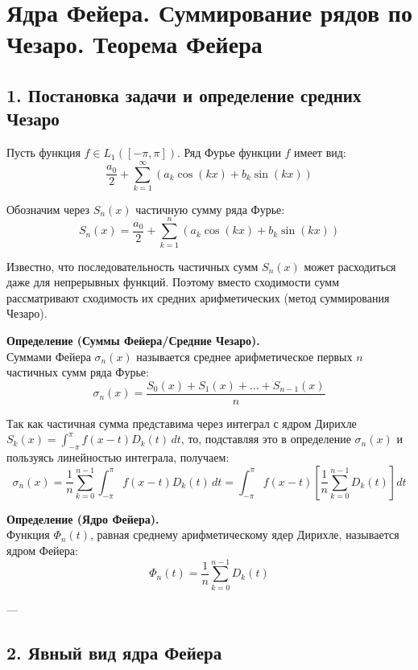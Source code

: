 \documentclass[12pt,a4paper,openany]{book}
\begin{document}
\section{ Ядра Фейера. Суммирование рядов по Чезаро. Теорема Фейера}

\subsection{1. Постановка задачи и определение средних Чезаро}

Пусть функция $f \in L_1([-\pi, \pi])$. Ряд Фурье функции $f$ имеет вид:
$$ \frac{a_0}{2} + \sum_{k=1}^{\infty} (a_k \cos(kx) + b_k \sin(kx)) $$

Обозначим через $S_n(x)$ частичную сумму ряда Фурье:
$$ S_n(x) = \frac{a_0}{2} + \sum_{k=1}^{n} (a_k \cos(kx) + b_k \sin(kx)) $$

Известно, что последовательность частичных сумм $S_n(x)$ может расходиться даже для непрерывных функций. Поэтому вместо сходимости сумм рассматривают сходимость их средних арифметических (метод суммирования Чезаро).

\textbf{Определение (Суммы Фейера/Средние Чезаро).} \\
Суммами Фейера $\sigma_n(x)$ называется среднее арифметическое первых $n$ частичных сумм ряда Фурье:
\begin{equation}
    \sigma_n(x) = \frac{S_0(x) + S_1(x) + \dots + S_{n-1}(x)}{n}
\end{equation}

Так как частичная сумма представима через интеграл с ядром Дирихле $S_k(x) = \int_{-\pi}^{\pi} f(x-t)D_k(t)\,dt$, то, подставляя это в определение $\sigma_n(x)$ и пользуясь линейностью интеграла, получаем:
$$ \sigma_n(x) = \frac{1}{n} \sum_{k=0}^{n-1} \int_{-\pi}^{\pi} f(x-t) D_k(t)\,dt = \int_{-\pi}^{\pi} f(x-t) \left[ \frac{1}{n} \sum_{k=0}^{n-1} D_k(t) \right] dt $$

\textbf{Определение (Ядро Фейера).} \\
Функция $\Phi_n(t)$, равная среднему арифметическому ядер Дирихле, называется ядром Фейера:
\begin{equation}
    \Phi_n(t) = \frac{1}{n} \sum_{k=0}^{n-1} D_k(t)
\end{equation}

---

\subsection{2. Явный вид ядра Фейера}
\end{document}
